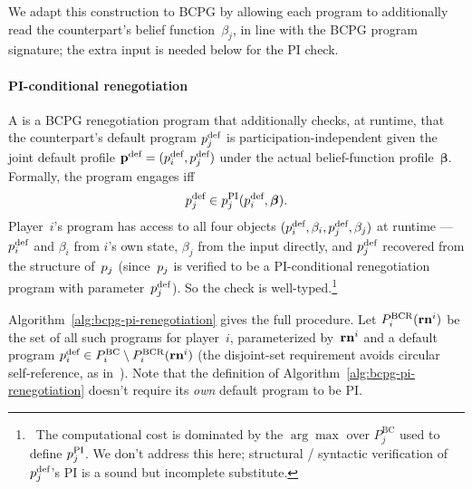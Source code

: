 \documentclass[sigconf]{aamas}
\newcommand{\fullbf}{\boldsymbol{\beta}}
\theoremstyle{definition}
\newcommand{\bcprogspacei}{P^{\mathrm{BC}}_i}
\newcommand{\bcprogspacej}{P^{\mathrm{BC}}_j}
\newcommand{\bcpirenegspacei}{P^{\mathrm{BCR}}_i}
\begin{document}
We adapt this construction to BCPG by allowing each program to additionally read the counterpart's belief function~$\beta_j$, in line with the BCPG program signature; the extra input is needed below for the PI check.

\paragraph{PI-conditional renegotiation}
A  is a BCPG renegotiation program that additionally checks, at runtime, that the counterpart's default program $p_j^{\textnormal{def}}$ is participation-independent given the joint default profile ${\textbf{p}}^{\textnormal{def}} = (p_i^{\textnormal{def}}, p_j^{\textnormal{def}})$ under the actual belief-function profile~$\fullbf$. Formally, the program engages iff
$$\defprogj \in \progj^{\text{PI}}(\defprogi, \fullbf).$$
Player~$i$'s program has access to all four objects $(p_i^{\textnormal{def}}, \beta_i, p_j^{\textnormal{def}}, \beta_j)$ at runtime --- $p_i^{\textnormal{def}}$ and $\beta_i$ from $i$'s own state, $\beta_j$ from the input directly, and $p_j^{\textnormal{def}}$ recovered from the structure of~$p_j$ (since~$p_j$ is verified to be a PI-conditional renegotiation program with parameter~$p_j^{\textnormal{def}}$). So the check is well-typed.\footnote{\ The computational cost is dominated by the $\arg\max$ over $\bcprogspacej$ used to define $p_j^{\text{PI}}$. We don't address this here; structural / syntactic verification of $p_j^{\textnormal{def}}$'s PI is a sound but incomplete substitute.}

Algorithm~\ref{alg:bcpg-pi-renegotiation} gives the full procedure. Let $\bcpirenegspacei(\smrenegi)$ be the set of all such programs for player~$i$, parameterized by~$\mathbf{rn}^i$ and a default program $\defprogi \in \bcprogspacei \setminus \bcpirenegspacei(\smrenegi)$ (the disjoint-set requirement avoids circular self-reference, as in~\citet[Sec.~3.2]{digiovanni2024safe}). Note that the definition of Algorithm~\ref{alg:bcpg-pi-renegotiation} doesn't require its \textit{own} default program to be PI.
\end{document}
